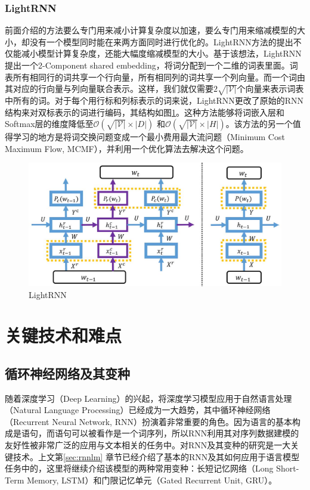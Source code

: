 \documentclass[12pt,a4paper]{article}
\begin{document}
\subsubsection{LightRNN}

前面介绍的方法要么专门用来减小计算复杂度以加速，要么专门用来缩减模型的大小，却没有一个模型同时能在来两方面同时进行优化的。LightRNN方法的提出不仅能减小模型计算复杂度，还能大幅度缩减模型的大小\cite{DBLP:conf/nips/LiQYHL16}。基于该想法，LightRNN提出一个2-Component shared embedding，将词分配到一个二维的词表里面。词表所有相同行的词共享一个行向量，所有相同列的词共享一个列向量。而一个词由其对应的行向量与列向量联合表示。这样，我们就仅需要${2\sqrt{|\mathcal{V}|}}$个向量来表示词表中所有的词。对于每个用行标和列标表示的词来说，LightRNN更改了原始的RNN 结构来对双标表示的词进行编码，其结构如图\ref{fig:lightrnn}。这种方法能够将词嵌入层和Softmax层的维度降低至${\mathcal{O}(\sqrt{|\mathcal{V}|} \times |D|)}$ 和${\mathcal{O}(\sqrt{|\mathcal{V}|} \times |H|)}$。该方法的另一个值得学习的地方是将词交换问题变成一个最小费用最大流问题（Minimum Cost Maximum Flow, MCMF），并利用一个优化算法\cite{Preis1999}去解决这个问题。
\begin{figure}[!ht]
  \centering
  \includegraphics[width=0.65\columnwidth]{./figures/lightrnn.jpg}
  \caption{LightRNN}
  \label{fig:lightrnn}
\end{figure}

\section{关键技术和难点}

\subsection{循环神经网络及其变种}
随着深度学习（Deep Learning）的兴起，将深度学习模型应用于自然语言处理（Natural Language Processing）已经成为一大趋势，其中循环神经网络（Recurrent Neural Network, RNN）扮演着非常重要的角色。因为语言的基本构成是语句，而语句可以被看作是一个词序列，所以RNN利用其对序列数据建模的友好性被非常广泛的应用与文本相关的任务中。对RNN及其变种的研究是一大关键技术。上文第\ref{sec:rnnlm} 章节已经介绍了基本的RNN及其如何应用于语言模型任务中的，这里将继续介绍该模型的两种常用变种：长短记忆网络（Long Short-Term Memory, LSTM）\cite{DBLP:journals/neco/HochreiterS97,DBLP:conf/interspeech/SundermeyerSN12}和门限记忆单元（Gated Recurrent Unit, GRU）\cite{DBLP:journals/corr/Pezeshki15}。
\end{document}
